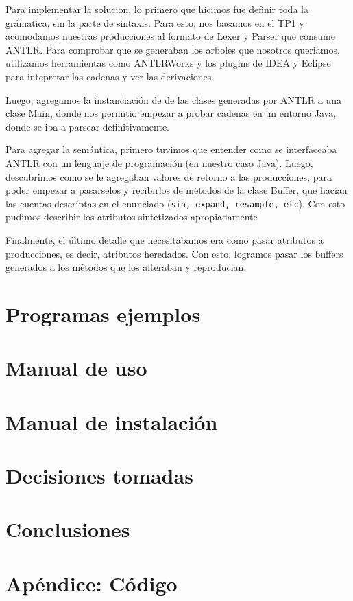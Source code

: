 \documentclass[a4paper]{article}
\begin{document}
Para implementar la solucion, lo primero que hicimos fue definir toda la
gr\'amatica, sin la parte de sintaxis. Para esto, nos basamos en el TP1 y
acomodamos nuestras producciones al formato de Lexer y Parser que consume ANTLR.
Para comprobar que se generaban los arboles que nosotros queriamos, utilizamos
herramientas como ANTLRWorks y los plugins de IDEA y Eclipse para intepretar 
las cadenas y ver las derivaciones. 

Luego, agregamos la instanciaci\'on de de las clases generadas por ANTLR
a una clase Main, donde nos permitio empezar a probar cadenas en un 
entorno Java, donde se iba a parsear definitivamente.

Para agregar la sem\'antica, primero tuvimos que entender como se interfaceaba
ANTLR con un lenguaje de programaci\'on (en nuestro caso Java). Luego, descubrimos
como se le agregaban valores de retorno a las producciones, para poder empezar
a pasarselos y recibirlos de m\'etodos de la clase Buffer, que hacian las cuentas
descriptas en el enunciado (\texttt{sin, expand, resample, etc}). Con esto
pudimos describir los atributos sintetizados apropiadamente

Finalmente, el \'ultimo detalle que necesitabamos era como pasar atributos a
producciones, es decir, atributos heredados. Con esto, logramos pasar
los buffers generados a los m\'etodos que los alteraban y reproducian.

\section{Programas ejemplos}

\section{Manual de uso}
\section{Manual de instalaci\'on}
\section{Decisiones tomadas}
\section{Conclusiones}
\section{Ap\'endice: C\'odigo}
\end{document}
